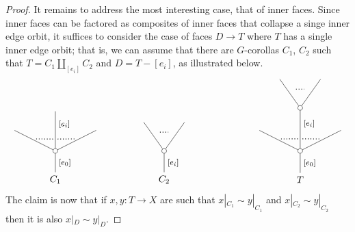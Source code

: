 \documentclass[a4paper,10pt
,draft
]{article}%
\numberwithin{equation}{section}
\numberwithin{figure}{section}
\theoremstyle{definition} %
\newcommand{\1}{\ensuremath{\mathbbm 1}}%
\begin{document}
\begin{proof}
It remains to address the most interesting case,
that of inner faces. Since inner faces can be factored as composites of inner faces that collapse a singe inner edge orbit,
it suffices to consider the case of faces
$D \to T$ where $T$ has a single inner edge orbit; that is,
we can assume that there are $G$-corollas
$C_1$, $C_2$ such that 
$T = C_1 \amalg_{[e_i]} C_2$ and
$D = T - [e_i]$, as illustrated below.
\[
\begin{tikzpicture}
[grow=up,auto,level distance=3em,
every node/.style = {font=\footnotesize},
dummy/.style={circle,draw,inner sep=0pt,minimum size=1.75mm}]
	\node at (0,0) [font=\normalsize]{$C_1$}
		child{node [dummy] {}
			child[level distance=2.15em]{
			edge from parent node [swap,near end] {} node [inner sep=1pt,name=Kn] {}}
			child[level distance=4.5em]{node {}
			edge from parent node [pos=0.65,swap] {$[e_i]$}
node [near start,inner sep=1pt,name=Kone,swap] {}
node [near start,inner sep=1pt,name=Kone1] {}}
			child[level distance=2.15em]{
			edge from parent node [near end] {}
node [swap] {}
node [inner sep=1pt,name=Kn1,swap]{}}
		edge from parent node [swap] {$[e_0]$}
		};
		\draw [dotted,thick] (Kone) -- (Kn) ;
		\draw [dotted,thick] (Kone1) -- (Kn1) ;
	\node at (4,0) [font=\normalsize]{$C_2$}
		child{node [dummy] {}
			child{
			edge from parent node [swap,near end] {} node [name=Kn] {}}
			child{
			edge from parent node [near end] {}
node [name=Kone,swap] {}}
		edge from parent node [swap] {$[e_i]$}
		};
		\draw [dotted,thick] (Kone) -- (Kn) ;
	\node at (9,0) [font=\normalsize]{$T$}
		child{node [dummy] {}
			child[level distance=2.15em]{
			edge from parent node [swap,near end] {} node [inner sep=1pt,name=Kn] {}}
			child[level distance=4.5em]{node [dummy] {}
				child[level distance=3em]{
				edge from parent node [swap,near end] {} node [name=Kn2] {}}
				child[level distance=3em]{
				edge from parent node [near end] {}
node [name=Kone2,swap] {}}
			edge from parent node [pos=0.65,swap] {$[e_i]$}
node [near start,inner sep=1pt,name=Kone,swap] {}
node [near start,inner sep=1pt,name=Kone1] {}}
			child[level distance=2.15em]{
			edge from parent node [near end] {}
node [swap] {}
node [inner sep=1pt,name=Kn1,swap]{}}
		edge from parent node [swap] {$[e_0]$}
		};
		\draw [dotted,thick] (Kone) -- (Kn) ;
		\draw [dotted,thick] (Kone1) -- (Kn1) ;
		\draw [dotted,thick] (Kone2) -- (Kn2) ;
\end{tikzpicture}
\]
The claim is now that if
$x,y \colon T \to X$ are such that
$x|_{C_1} \sim y|_{C_1}$ and
$x|_{C_2} \sim y|_{C_2}$
then it is also 
$x|_{D} \sim y|_{D}$.

\end{proof}
\end{document}
